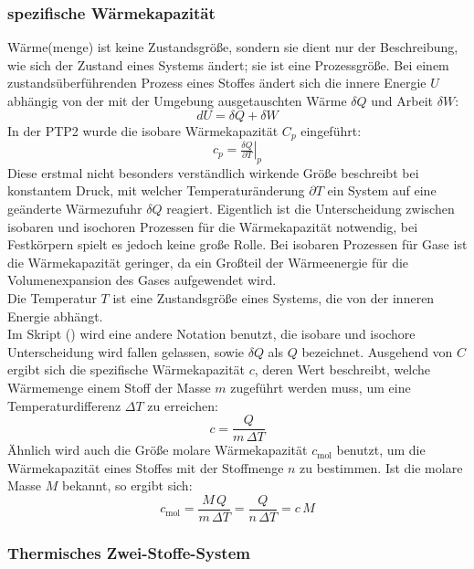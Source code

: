 \subsubsection{spezifische Wärmekapazität}
Wärme(menge) ist keine Zustandsgröße, sondern sie dient nur der Beschreibung, wie sich der Zustand eines Systems ändert; sie ist eine Prozessgröße. Bei einem zustandsüberführenden Prozess eines Stoffes ändert sich die innere Energie \(U\) abhängig von der mit der Umgebung ausgetauschten Wärme \(\delta Q\) und Arbeit \(\delta W\):
\begin{equation}
    dU=\delta Q+\delta W
\end{equation}
In der PTP2 wurde die isobare Wärmekapazität \(C_p\) eingeführt:
\begin{equation}
    c_p=\left.\tfrac{\delta Q}{\partial T}\right\vert_{p}
\end{equation}
Diese erstmal nicht besonders verständlich wirkende Größe beschreibt bei konstantem Druck, mit welcher Temperaturänderung \(\partial T\) ein System auf eine geänderte Wärmezufuhr \(\delta Q\) reagiert. Eigentlich ist die Unterscheidung zwischen isobaren und isochoren Prozessen für die Wärmekapazität notwendig, bei Festkörpern spielt es jedoch keine große Rolle. Bei isobaren Prozessen für Gase ist die Wärmekapazität geringer, da ein Großteil der Wärmeenergie für die Volumenexpansion des Gases aufgewendet wird.\\
Die Temperatur \(T\) ist eine Zustandsgröße eines Systems, die von der inneren Energie abhängt.\\
Im Skript (\autocite{Skript_1}) wird eine andere Notation benutzt, die isobare und isochore Unterscheidung wird fallen gelassen, sowie \(\delta Q\) als \(Q\) bezeichnet. Ausgehend von \(C\) ergibt sich die spezifische Wärmekapazität \(c\), deren Wert beschreibt, welche Wärmemenge einem Stoff der Masse \(m\) zugeführt werden muss, um eine Temperaturdifferenz \(\Delta T\) zu erreichen:
\begin{equation}
    c=\frac{Q}{m\,\Delta T}
    \label{c}
\end{equation}
Ähnlich wird auch die Größe molare Wärmekapazität \(c_{\text{mol}}\) benutzt, um die Wärmekapazität eines Stoffes mit der Stoffmenge \(n\) zu bestimmen. Ist die molare Masse \(M\) bekannt, so ergibt sich:
\begin{equation}
    c_{\text{mol}}=\frac{M\,Q}{m\,\Delta T}=\dfrac{Q}{n\,\Delta T}=c\,M
    \label{c_mol}
\end{equation}

\subsubsection{Thermisches Zwei-Stoffe-System}
